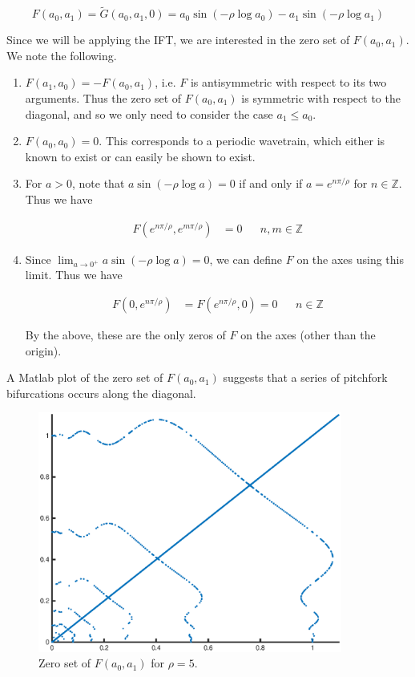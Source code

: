 \documentclass[12pt]{article}
\def\Z{{\mathbb Z}}
\begin{document}
\begin{equation}\label{defF}
F(a_0, a_1) = \tilde{G}(a_0, a_1, 0) = 
a_0 \sin \left( -\rho \log a_0 \right) - a_1 \sin \left( -\rho \log a_1 \right)
\end{equation}

Since we will be applying the IFT, we are interested in the zero set of $F(a_0, a_1)$. We note the following.

\begin{enumerate}
	\item $F(a_1, a_0) = -F(a_0, a_1)$, i.e. $F$ is antisymmetric with respect to its two arguments. Thus the zero set of $F(a_0, a_1)$ is symmetric with respect to the diagonal, and so we only need to consider the case $a_1 \leq a_0$.

	\item $F(a_0, a_0) = 0$. This corresponds to a periodic wavetrain, which either is known to exist or can easily be shown to exist.

	\item For $a > 0$, note that $a \sin \left( -\rho \log a \right) = 0$ if and only if $a = e^{n \pi / \rho}$ for $n \in \Z$. Thus we have

	\begin{align*}
	F(e^{n \pi / \rho}, e^{m \pi / \rho}) &= 0 && n, m \in \Z
	\end{align*}

    \item Since $\lim_{a \rightarrow 0^+} a \sin \left( -\rho \log a \right) = 0$, we can define $F$ on the axes using this limit. Thus we have

    \begin{align*}
	F(0, e^{n \pi / \rho}) &= F(e^{n \pi / \rho}, 0) = 0 && n \in \Z
	\end{align*}

	By the above, these are the only zeros of $F$ on the axes (other than the origin).
\end{enumerate}

A Matlab plot of the zero set of $F(a_0, a_1)$ suggests that a series of pitchfork bifurcations occurs along the diagonal.

\begin{figure}[H]
\label{fig:Fzeronumeric}
\includegraphics[width=10cm]{zeroset5.eps}
\caption{Zero set of $F(a_0, a_1)$ for $\rho = 5$.}
\end{figure}
\end{document}
